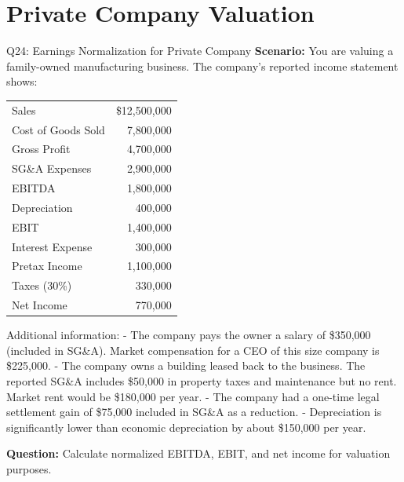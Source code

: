 \documentclass{beamer}
\renewcommand{\scriptsize}{\fontsize{6pt}{7pt}\selectfont}
\begin{document}
	
	\section{Private Company Valuation}
	
	\begin{frame}{Q24: Earnings Normalization for Private Company}
		\scriptsize
		\textbf{Scenario:} You are valuing a family-owned manufacturing business. The company's reported income statement shows:
		
		\begin{tabular}{lr}
			Sales & \$12,500,000 \\
			Cost of Goods Sold & 7,800,000 \\
			Gross Profit & 4,700,000 \\
			SG\&A Expenses & 2,900,000 \\
			EBITDA & 1,800,000 \\
			Depreciation & 400,000 \\
			EBIT & 1,400,000 \\
			Interest Expense & 300,000 \\
			Pretax Income & 1,100,000 \\
			Taxes (30\%) & 330,000 \\
			Net Income & 770,000 \\
		\end{tabular}
		
		Additional information:
		- The company pays the owner a salary of \$350,000 (included in SG\&A). Market compensation for a CEO of this size company is \$225,000.
		- The company owns a building leased back to the business. The reported SG\&A includes \$50,000 in property taxes and maintenance but no rent. Market rent would be \$180,000 per year.
		- The company had a one-time legal settlement gain of \$75,000 included in SG\&A as a reduction.
		- Depreciation is significantly lower than economic depreciation by about \$150,000 per year.
		
		\textbf{Question:} Calculate normalized EBITDA, EBIT, and net income for valuation purposes.
	\end{frame}
	
\end{document}
